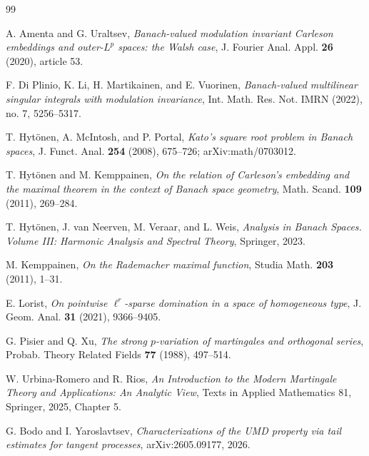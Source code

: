 \documentclass[11pt]{article}
\theoremstyle{definition}
\newcommand{\1}{\mathbf 1}
\begin{document}
\begin{thebibliography}{99}

A. Amenta and G. Uraltsev,
\emph{Banach-valued modulation invariant Carleson embeddings and outer-$L^p$
spaces: the Walsh case},
J. Fourier Anal. Appl. \textbf{26} (2020), article 53.

F. Di Plinio, K. Li, H. Martikainen, and E. Vuorinen,
\emph{Banach-valued multilinear singular integrals with modulation invariance},
Int. Math. Res. Not. IMRN (2022), no. 7, 5256--5317.

T. Hyt\"onen, A. McIntosh, and P. Portal,
\emph{Kato's square root problem in Banach spaces},
J. Funct. Anal. \textbf{254} (2008), 675--726;
arXiv:math/0703012.

T. Hyt\"onen and M. Kemppainen,
\emph{On the relation of Carleson's embedding and the maximal theorem in the
context of Banach space geometry},
Math. Scand. \textbf{109} (2011), 269--284.

T. Hyt\"onen, J. van Neerven, M. Veraar, and L. Weis,
\emph{Analysis in Banach Spaces. Volume III: Harmonic Analysis and Spectral
Theory},
Springer, 2023.

M. Kemppainen,
\emph{On the Rademacher maximal function},
Studia Math. \textbf{203} (2011), 1--31.

E. Lorist,
\emph{On pointwise $\ell^r$-sparse domination in a space of homogeneous type},
J. Geom. Anal. \textbf{31} (2021), 9366--9405.

G. Pisier and Q. Xu,
\emph{The strong $p$-variation of martingales and orthogonal series},
Probab. Theory Related Fields \textbf{77} (1988), 497--514.

W. Urbina-Romero and R. Rios,
\emph{An Introduction to the Modern Martingale Theory and Applications: An
Analytic View},
Texts in Applied Mathematics 81, Springer, 2025, Chapter 5.

G. Bodo and I. Yaroslavtsev,
\emph{Characterizations of the UMD property via tail estimates for tangent
processes},
arXiv:2605.09177, 2026.

\end{thebibliography}
\end{document}
